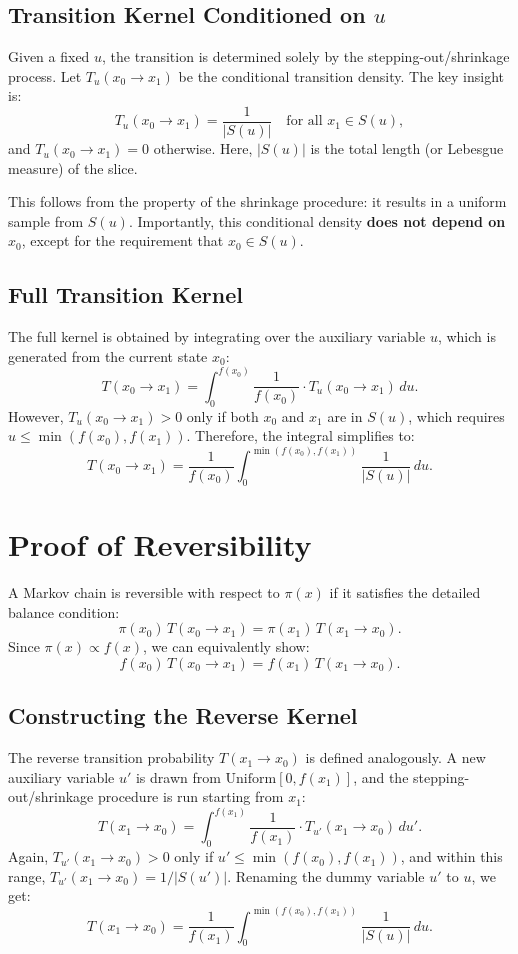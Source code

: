 \documentclass[12pt]{article}
\theoremstyle{definition}
\begin{document}
\subsection{Transition Kernel Conditioned on \( u \)}
Given a fixed \( u \), the transition is determined solely by the stepping-out/shrinkage process. Let \( T_u(x_0 \to x_1) \) be the conditional transition density. The key insight is:
\[
T_u(x_0 \to x_1) = \frac{1}{|S(u)|} \quad \text{for all } x_1 \in S(u),
\]
and \( T_u(x_0 \to x_1) = 0 \) otherwise. Here, \( |S(u)| \) is the total length (or Lebesgue measure) of the slice.

This follows from the property of the shrinkage procedure: it results in a uniform sample from \( S(u) \). Importantly, this conditional density \textbf{does not depend on} \( x_0 \), except for the requirement that \( x_0 \in S(u) \).

\subsection{Full Transition Kernel}
The full kernel is obtained by integrating over the auxiliary variable \( u \), which is generated from the current state \( x_0 \):
\[
T(x_0 \to x_1) = \int_{0}^{f(x_0)} \frac{1}{f(x_0)} \cdot T_u(x_0 \to x_1) \, du.
\]
However, \( T_u(x_0 \to x_1) > 0 \) only if both \( x_0 \) and \( x_1 \) are in \( S(u) \), which requires \( u \le \min(f(x_0), f(x_1)) \). Therefore, the integral simplifies to:
\[
T(x_0 \to x_1) = \frac{1}{f(x_0)} \int_{0}^{\min(f(x_0), f(x_1))} \frac{1}{|S(u)|} \, du. \tag{1}
\]

\section{Proof of Reversibility}
A Markov chain is reversible with respect to \( \pi(x) \) if it satisfies the detailed balance condition:
\[
\pi(x_0) \, T(x_0 \to x_1) = \pi(x_1) \, T(x_1 \to x_0).
\]
Since \( \pi(x) \propto f(x) \), we can equivalently show:
\[
f(x_0) \, T(x_0 \to x_1) = f(x_1) \, T(x_1 \to x_0). \tag{2}
\]

\subsection{Constructing the Reverse Kernel}
The reverse transition probability \( T(x_1 \to x_0) \) is defined analogously. A new auxiliary variable \( u' \) is drawn from \( \text{Uniform}[0, f(x_1)] \), and the stepping-out/shrinkage procedure is run starting from \( x_1 \):
\[
T(x_1 \to x_0) = \int_{0}^{f(x_1)} \frac{1}{f(x_1)} \cdot T_{u'}(x_1 \to x_0) \, du'.
\]
Again, \( T_{u'}(x_1 \to x_0) > 0 \) only if \( u' \le \min(f(x_0), f(x_1)) \), and within this range, \( T_{u'}(x_1 \to x_0) = 1 / |S(u')| \). Renaming the dummy variable \( u' \) to \( u \), we get:
\[
T(x_1 \to x_0) = \frac{1}{f(x_1)} \int_{0}^{\min(f(x_0), f(x_1))} \frac{1}{|S(u)|} \, du. \tag{3}
\]
\end{document}
